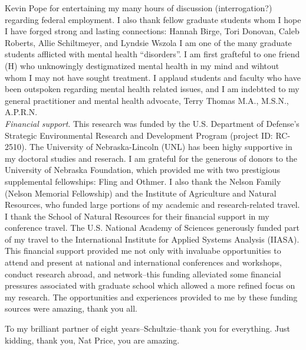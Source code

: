 \documentclass[12pt,twoside,openany]{reedthesis}
\begin{document}
\begin{acknowledgements}
    Kevin Pope for entertaining my many hours of discussion (interrogation?)
    regarding federal employment. I also thank fellow graduate students whom
    I hope I have forged strong and lasting connections: Hannah Birge, Tori
    Donovan, Caleb Roberts, Allie Schiltmeyer, and Lyndsie Wszola I am one
    of the many graduate students afflicted with mental health
    ``disorders''. I am first grafteful to one friend (H) who unknowingly
    destigmatized mental health in my mind and wihtout whom I may not have
    sought treatment. I applaud students and faculty who have been outspoken
    regarding mental health related issues, and I am indebtted to my general
    practitioner and mental health advocate, Terry Thomas M.A., M.S.N.,
    A.P.R.N.\\
    \emph{Financial support}. This research was funded by the U.S.
    Department of Defense's Strategic Environmental Research and Development
    Program (project ID: RC-2510). The University of Nebraska-Lincoln (UNL)
    has been highy supportive in my doctoral studies and reserach. I am
    grateful for the generous of donors to the University of Nebraska
    Foundation, which provided me with two prestigious supplemental
    fellowships: Fling and Othmer. I also thank the Nelson Family (Nelson
    Memorial Fellowship) and the Institute of Agriculture and Natural
    Resources, who funded large portions of my academic and research-related
    travel. I thank the School of Natural Resources for their financial
    support in my conference travel. The U.S. National Academy of Sciences
    generously funded part of my travel to the International Institute for
    Applied Systems Analysis (IIASA). This financial support provided me not
    only with invaluabe opportunities to attend and present at national and
    international conferences and workshops, conduct research abroad, and
    network--this funding alleviated some financial pressures associated
    with graduate school which allowed a more refined focus on my research.
    The opportunities and experiences provided to me by these funding
    sources were amazing, thank you all.
    
    To my brilliant partner of eight years--Schultzie--thank you for
    everything. Just kidding, thank you, Nat Price, you are amazing.
  \end{acknowledgements}

  \hypersetup{linkcolor=black}
  \setcounter{tocdepth}{2}
  \tableofcontents

  \listoftables
\end{document}
